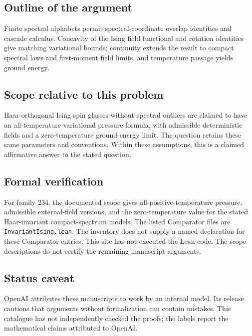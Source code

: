 \documentclass[11pt]{article}
\begin{document}
\subsection{Outline of the argument}
Finite spectral alphabets permit spectral-coordinate overlap identities and cascade calculus. Concavity of the Ising field functional and rotation identities give matching variational bounds; continuity extends the result to compact spectral laws and first-moment field limits, and temperature passage yields ground energy.

\subsection{Scope relative to this problem}
Haar-orthogonal Ising spin glasses without spectral outliers are claimed to have an all-temperature variational pressure formula, with admissible deterministic fields and a zero-temperature ground-energy limit. The question retains these same parameters and conventions. Within these assumptions, this is a claimed affirmative answer to the stated question.

\subsection{Formal verification}
For family 234, the documented scope gives all-positive-temperature pressure, admissible external-field versions, and the zero-temperature value for the stated Haar-invariant compact-spectrum models. The listed Comparator files are \texttt{InvariantIsing.lean}. The inventory does not supply a named declaration for these Comparator entries. This site has not executed the Lean code. The scope descriptions do not certify the remaining manuscript arguments.

\subsection{Status caveat}
OpenAI attributes these manuscripts to work by an internal model. Its release cautions that arguments without formalization can contain mistakes. This catalogue has not independently checked the proofs; the labels report the mathematical claims attributed to OpenAI.
\end{document}
